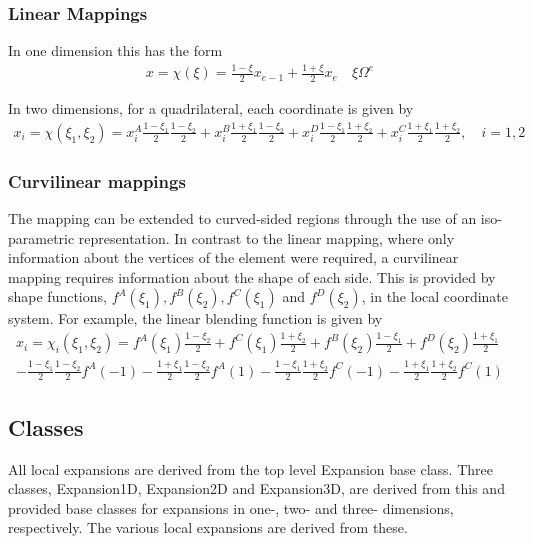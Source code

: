 \subsubsection{Linear Mappings}
In one dimension this has the form
\begin{align*}
x = \chi(\xi) = \frac{1-\xi}{2}x_{e-1} + \frac{1+\xi}{2}x_e \quad \xi
\Omega^e
\end{align*}

In two dimensions, for a quadrilateral, each coordinate is given by
\begin{align*}
x_i = \chi(\xi_1,\xi_2) = x_i^A\frac{1-\xi_1}{2}\frac{1-\xi_2}{2} +
x_i^B\frac{1+\xi_1}{2}\frac{1-\xi_2}{2} +
x_i^D\frac{1-\xi_1}{2}\frac{1+\xi_2}{2} +
x_i^C\frac{1+\xi_1}{2}\frac{1+\xi_2}{2}, \quad i=1,2
\end{align*}

\subsubsection{Curvilinear mappings}

The mapping can be extended to curved-sided regions through the use of an
iso-parametric representation. In contrast to the linear mapping, where only
information about the vertices of the element were required, a curvilinear
mapping requires information about the shape of each side. This is provided by
shape functions, $f^A(\xi_1), f^B(\xi_2), f^C(\xi_1)$ and
$f^D(\xi_2)$, in the local coordinate system. For example, the linear
blending function is given by
\begin{align*}
  x_i = \chi_i(\xi_1,\xi_2) = f^A(\xi_1)\frac{1-\xi_2}{2} +
  f^C(\xi_1)\frac{1+\xi_2}{2} + f^B(\xi_2)\frac{1-\xi_1}{2} +
  f^D(\xi_2)\frac{1+\xi_1}{2}\\ - \frac{1-\xi_1}{2}\frac{1-\xi_2}{2}f^A(-1) -
  \frac{1+\xi_1}{2}\frac{1-\xi_2}{2}f^A(1) -
  \frac{1-\xi_1}{2}\frac{1+\xi_2}{2}f^C(-1) -
  \frac{1+\xi_1}{2}\frac{1+\xi_2}{2}f^C(1)
\end{align*}

\subsection{Classes}
All local expansions are derived from the top level Expansion base class. Three
classes, Expansion1D, Expansion2D and Expansion3D, are derived from this and
provided base classes for expansions in one-, two- and three- dimensions,
respectively. The various local expansions are derived from these.

